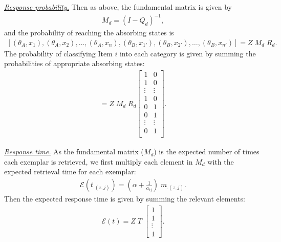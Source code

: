 \documentclass[doc]{apa6}
\newcommand{\subsubsubsection}[1]{\textit{\underline{#1}}}
\begin{document}
\subsubsubsection{Response probability.} Then as above, the fundamental matrix is given by
\begin{align}
    M_{d} = {\left(I - Q_{d} \right)}^{-1},
\end{align}
and the probability of reaching the absorbing states is
\begin{align}
    \left[(\theta_{A}, x_{1}),  (\theta_{A}, x_{2}),  \ldots, (\theta_{A}, x_{n}),
        (\theta_{B}, x_{1'}), (\theta_{B}, x_{2'}), \ldots, (\theta_{B}, x_{n'})\right]
    = Z \; M_{d} \; R_{d}.
\end{align}
The probability of classifying Item $i$ into each category is given by summing the probabilities of
appropriate absorbing states:
\begin{align}
    [p(\mathbb{A}), \; p(\mathbb{B})] =
        Z \; M_{d} \; R_{d}
        \left[
            \begin{array}{cc}
                1      & 0      \\
                1      & 0      \\
                \vdots & \vdots \\
                1      & 0      \\
                0      & 1      \\
                0      & 1      \\
                \vdots & \vdots \\
                0      & 1      \\
            \end{array}
        \right].
\end{align}

\subsubsubsection{Response time.} As the fundamental matrix ($M_{d}$) is the expected number of times each exemplar is retrieved, we first multiply each element in $M_{d}$ with the expected retrieval time for each exemplar:
\begin{align}
    \mathcal{E}(t_{.(z, j)}) = \left( \alpha + \frac{1}{a_{ij}} \right) \; m_{.(z, j)}.
\end{align}
Then the expected response time is given by summing the relevant elements:
\begin{align}
    \mathcal{E}(t) = Z \; T \; \left[ \begin{array}{c} 1 \\ 1 \\ \vdots \\ 1 \end{array} \right].
\end{align}
\end{document}
